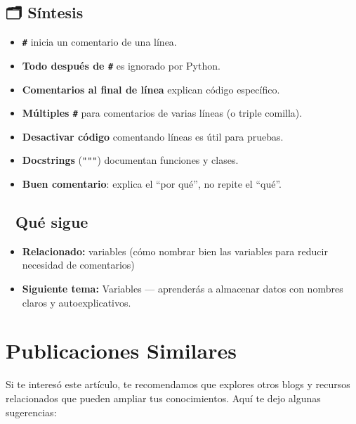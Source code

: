 \documentclass[
  doc,
  floatsintext,
  longtable,
  a4paper,
  nolmodern,
  notxfonts,
  notimes,
  12pt,
  colorlinks=true,linkcolor=blue,citecolor=blue,urlcolor=blue]{apa7}
\providecommand{\tightlist}{%
  \setlength{\itemsep}{0pt}\setlength{\parskip}{0pt}}
\begin{document}
\subsection{🗂️ Síntesis}\label{suxedntesis}

\begin{itemize}
\tightlist
\item
  \textbf{\texttt{\#}} inicia un comentario de una línea.
\item
  \textbf{Todo después de \texttt{\#}} es ignorado por Python.
\item
  \textbf{Comentarios al final de línea} explican código específico.
\item
  \textbf{Múltiples \texttt{\#}} para comentarios de varias líneas (o
  triple comilla).
\item
  \textbf{Desactivar código} comentando líneas es útil para pruebas.
\item
  \textbf{Docstrings} (\texttt{"""}) documentan funciones y clases.
\item
  \textbf{Buen comentario}: explica el ``por qué'', no repite el
  ``qué''.
\end{itemize}

\subsection{🔗 Qué sigue}\label{quuxe9-sigue}

\begin{itemize}
\tightlist
\item
  \textbf{Relacionado:} variables (cómo nombrar bien las variables para
  reducir necesidad de comentarios)
\item
  \textbf{Siguiente tema:} Variables --- aprenderás a almacenar datos
  con nombres claros y autoexplicativos.
\end{itemize}

\section{Publicaciones Similares}\label{publicaciones-similares}

Si te interesó este artículo, te recomendamos que explores otros blogs y
recursos relacionados que pueden ampliar tus conocimientos. Aquí te dejo
algunas sugerencias:
\end{document}
